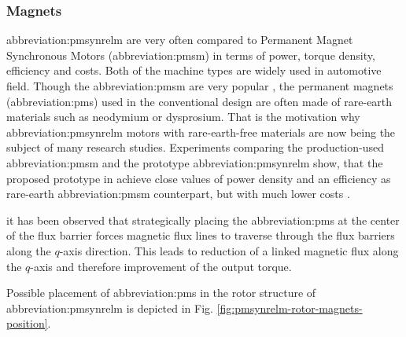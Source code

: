 \documentclass[a4paper, twoside, 11pt]{article}
\begin{document}
    \subsubsection{Magnets}
        \gls{abbreviation:pmsynrelm} are very often compared to Permanent Magnet Synchronous Motors (\gls{abbreviation:pmsm}) in terms of power, torque density, efficiency and costs. Both of the machine types are widely used in automotive field. Though the \gls{abbreviation:pmsm} are very popular \cite{morimoto-experimental-evaulation-of-a-rare-earth-free-pmasynrm-with-ferrite-magnets-for-automotive-applications}, the permanent magnets (\gls{abbreviation:pm}s) used in the conventional design are often made of rare-earth materials such as neodymium or dysprosium. That is the motivation why \gls{abbreviation:pmsynrelm} motors with rare-earth-free materials are now being the subject of many research studies. Experiments comparing the production-used \gls{abbreviation:pmsm} and the prototype \gls{abbreviation:pmsynrelm} show, that the proposed prototype in \cite{mashiro-performance-of-mpasynrm-with-ferrite-magnets-for-ev-hv-applications-considering-productivity} achieve close values of power density and an efficiency as rare-earth \gls{abbreviation:pmsm} counterpart, but with much lower costs \cite{haiwei-low-cost-ferrite-pm-assisted-synchronous-reluctance-machine-for-electric-vehicles}.\par
it has been observed that strategically placing the \gls{abbreviation:pm}s at the center of the flux barrier forces magnetic flux lines to traverse through the flux barriers along the $q$-axis direction. This leads to reduction of a linked magnetic flux along the $q$-axis and therefore improvement of the output torque. \cite{ibrahim-permanent-magnet-assisted-synchronous-reluctance-motor-employing-a-hybrid-star-delta-winding-for-high-speed-applicaitons, ngo-performance-analysis-of-synchronous-reluctance-motor-with-limited-amount-of-permanent-magnet}\par
Possible placement of \gls{abbreviation:pm}s in the rotor structure of \gls{abbreviation:pmsynrelm} is depicted in Fig. \ref{fig:pmsynrelm-rotor-magnets-position}.
\end{document}

